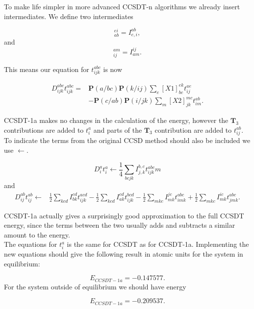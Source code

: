 To make life simpler in more advanced CCSDT-n algorithms we already insert intermediates. We define two intermediates 

\begin{equation}
[X1]_{ab}^{ei} = I_{e,i}^{ab} ,
\end{equation}
and
\begin{equation}
[X2]_{ij}^{am} = I_{am}^{ij} .
\end{equation}

This means our equation for $t_{ijk}^{abc}$ is now

\begin{align}
D_{ijk}^{abc} t_{ijk}^{abc} = & \textbf{P}(a/bc) \textbf{P}(k/ij) \sum_e [X1]^{ek}_{bc} t_{ij}^{ae} \\ \nonumber &
- \textbf{P}(c/ab) \textbf{P}(i/jk) \sum_m [X2]_{jk}^{mc} t_{im}^{ab} .
\end{align}

CCSDT-1a makes no changes in the calculation of the energy, however the $\textbf{T}_3$ contributions are added to $t_i^a$ and parts of the $\textbf{T}_3$ contribution are added to $t_{ij}^{ab}$. To indicate the terms from the original CCSD method should also be included we use $\leftarrow$. 

\begin{equation}
D_i^a t_i^a \leftarrow \frac{1}{4} \sum_{bcjk}  I_{j,k}^{b,c} t_{ijk}^{abc} m
\end{equation}
and
\begin{align}
D_{ij}^{ab} t_{ij}^{ab} \leftarrow & 
\frac{1}{2} \sum_{kcd} I_{bk}^{cd} t_{ijk}^{acd}
- \frac{1}{2} \sum_{kcd} I_{ak}^{cd} t_{ijk}^{bcd} - \frac{1}{2} \sum_{mkc} I_{mk}^{jc} t_{imk}^{abc} + \frac{1}{2} \sum_{mkc} I_{mk}^{ic} t_{jmk}^{abc} .
\end{align}

CCSDT-1a actually gives a surprisingly good approximation to the full CCSDT energy, since the terms between the two usually adds and subtracts a similar amount to the energy. \\

The equations for $t_i^a$ is the same for CCSDT as for CCSDT-1a. Implementing the new equations should give the following result in atomic units for the system in equilibrium:

\begin{equation}
E_{CCSDT-1a} = -0.147577 .
\end{equation}
For the system outside of equilibrium we should have energy

\begin{equation}
E_{CCSDT-1a} = -0.209537 .
\end{equation}

